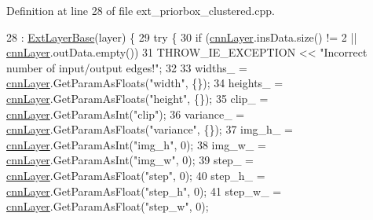 Definition at line 28 of file ext\+\_\+priorbox\+\_\+clustered.\+cpp.


\begin{DoxyCode}
28                                                          : \hyperlink{classInferenceEngine_1_1Extensions_1_1Cpu_1_1ExtLayerBase_affff0e8263ca26852ccf71d299d7b06a}{ExtLayerBase}(layer) \{
29         \textcolor{keywordflow}{try} \{
30             \textcolor{keywordflow}{if} (\hyperlink{classInferenceEngine_1_1Extensions_1_1Cpu_1_1ExtLayerBase_a1074cdccacb9e9ca6eec01bbc2f7ca4a}{cnnLayer}.insData.size() != 2 || \hyperlink{classInferenceEngine_1_1Extensions_1_1Cpu_1_1ExtLayerBase_a1074cdccacb9e9ca6eec01bbc2f7ca4a}{cnnLayer}.outData.empty())
31                 THROW\_IE\_EXCEPTION << \textcolor{stringliteral}{"Incorrect number of input/output edges!"};
32 
33             widths\_ = \hyperlink{classInferenceEngine_1_1Extensions_1_1Cpu_1_1ExtLayerBase_a1074cdccacb9e9ca6eec01bbc2f7ca4a}{cnnLayer}.GetParamAsFloats(\textcolor{stringliteral}{"width"}, \{\});
34             heights\_ = \hyperlink{classInferenceEngine_1_1Extensions_1_1Cpu_1_1ExtLayerBase_a1074cdccacb9e9ca6eec01bbc2f7ca4a}{cnnLayer}.GetParamAsFloats(\textcolor{stringliteral}{"height"}, \{\});
35             clip\_ = \hyperlink{classInferenceEngine_1_1Extensions_1_1Cpu_1_1ExtLayerBase_a1074cdccacb9e9ca6eec01bbc2f7ca4a}{cnnLayer}.GetParamAsInt(\textcolor{stringliteral}{"clip"});
36             variance\_ = \hyperlink{classInferenceEngine_1_1Extensions_1_1Cpu_1_1ExtLayerBase_a1074cdccacb9e9ca6eec01bbc2f7ca4a}{cnnLayer}.GetParamAsFloats(\textcolor{stringliteral}{"variance"}, \{\});
37             img\_h\_ = \hyperlink{classInferenceEngine_1_1Extensions_1_1Cpu_1_1ExtLayerBase_a1074cdccacb9e9ca6eec01bbc2f7ca4a}{cnnLayer}.GetParamAsInt(\textcolor{stringliteral}{"img\_h"}, 0);
38             img\_w\_ = \hyperlink{classInferenceEngine_1_1Extensions_1_1Cpu_1_1ExtLayerBase_a1074cdccacb9e9ca6eec01bbc2f7ca4a}{cnnLayer}.GetParamAsInt(\textcolor{stringliteral}{"img\_w"}, 0);
39             step\_ = \hyperlink{classInferenceEngine_1_1Extensions_1_1Cpu_1_1ExtLayerBase_a1074cdccacb9e9ca6eec01bbc2f7ca4a}{cnnLayer}.GetParamAsFloat(\textcolor{stringliteral}{"step"}, 0);
40             step\_h\_ = \hyperlink{classInferenceEngine_1_1Extensions_1_1Cpu_1_1ExtLayerBase_a1074cdccacb9e9ca6eec01bbc2f7ca4a}{cnnLayer}.GetParamAsFloat(\textcolor{stringliteral}{"step\_h"}, 0);
41             step\_w\_ = \hyperlink{classInferenceEngine_1_1Extensions_1_1Cpu_1_1ExtLayerBase_a1074cdccacb9e9ca6eec01bbc2f7ca4a}{cnnLayer}.GetParamAsFloat(\textcolor{stringliteral}{"step\_w"}, 0);

\end{DoxyCode}
